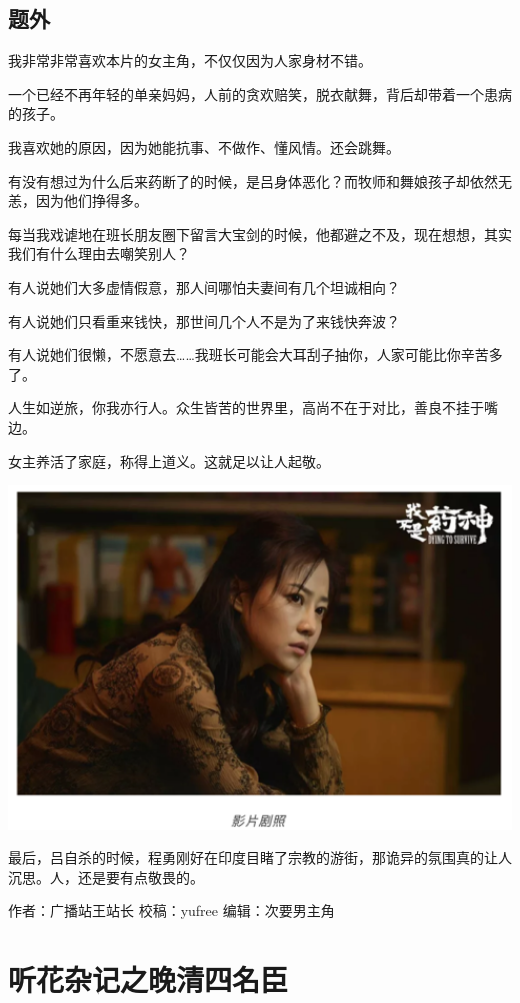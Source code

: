 \documentclass[]{book}
\begin{document}
\subsection{题外}

我非常非常喜欢本片的女主角，不仅仅因为人家身材不错。

一个已经不再年轻的单亲妈妈，人前的贪欢赔笑，脱衣献舞，背后却带着一个患病的孩子。

我喜欢她的原因，因为她能抗事、不做作、懂风情。还会跳舞。

有没有想过为什么后来药断了的时候，是吕身体恶化？而牧师和舞娘孩子却依然无恙，因为他们挣得多。

每当我戏谑地在班长朋友圈下留言大宝剑的时候，他都避之不及，现在想想，其实我们有什么理由去嘲笑别人？

有人说她们大多虚情假意，那人间哪怕夫妻间有几个坦诚相向？

有人说她们只看重来钱快，那世间几个人不是为了来钱快奔波？

有人说她们很懒，不愿意去\ldots{}\ldots{}我班长可能会大耳刮子抽你，人家可能比你辛苦多了。

人生如逆旅，你我亦行人。众生皆苦的世界里，高尚不在于对比，善良不挂于嘴边。

女主养活了家庭，称得上道义。这就足以让人起敬。

\includegraphics[width=6.67in]{images/yaoshen3}

最后，吕自杀的时候，程勇刚好在印度目睹了宗教的游街，那诡异的氛围真的让人沉思。人，还是要有点敬畏的。

作者：广播站王站长 校稿：yufree 编辑：次要男主角

\section{听花杂记之晚清四名臣}
\end{document}

